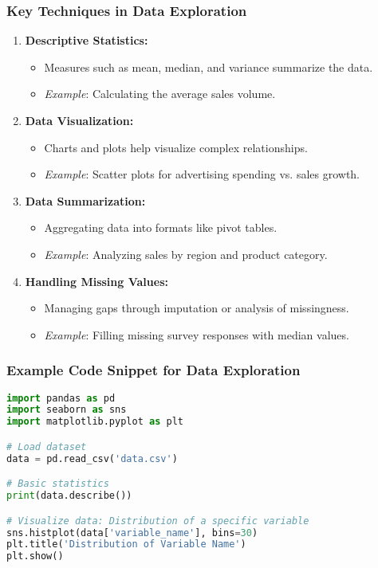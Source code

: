 \documentclass[aspectratio=169]{beamer}
\begin{document}
\begin{frame}[fragile]
    \frametitle{Key Techniques in Data Exploration}
    \begin{enumerate}
        \item \textbf{Descriptive Statistics:}
            \begin{itemize}
                \item Measures such as mean, median, and variance summarize the data.
                \item \textit{Example}: Calculating the average sales volume.
            \end{itemize}
        
        \item \textbf{Data Visualization:}
            \begin{itemize}
                \item Charts and plots help visualize complex relationships.
                \item \textit{Example}: Scatter plots for advertising spending vs. sales growth.
            \end{itemize}
        
        \item \textbf{Data Summarization:}
            \begin{itemize}
                \item Aggregating data into formats like pivot tables.
                \item \textit{Example}: Analyzing sales by region and product category.
            \end{itemize}
        
        \item \textbf{Handling Missing Values:}
            \begin{itemize}
                \item Managing gaps through imputation or analysis of missingness.
                \item \textit{Example}: Filling missing survey responses with median values.
            \end{itemize}
    \end{enumerate}
\end{frame}

\begin{frame}[fragile]
    \frametitle{Example Code Snippet for Data Exploration}
    \begin{lstlisting}[language=Python]
import pandas as pd
import seaborn as sns
import matplotlib.pyplot as plt

# Load dataset
data = pd.read_csv('data.csv')

# Basic statistics
print(data.describe())

# Visualize data: Distribution of a specific variable
sns.histplot(data['variable_name'], bins=30)
plt.title('Distribution of Variable Name')
plt.show()
    \end{lstlisting}
\end{frame}
\end{document}
